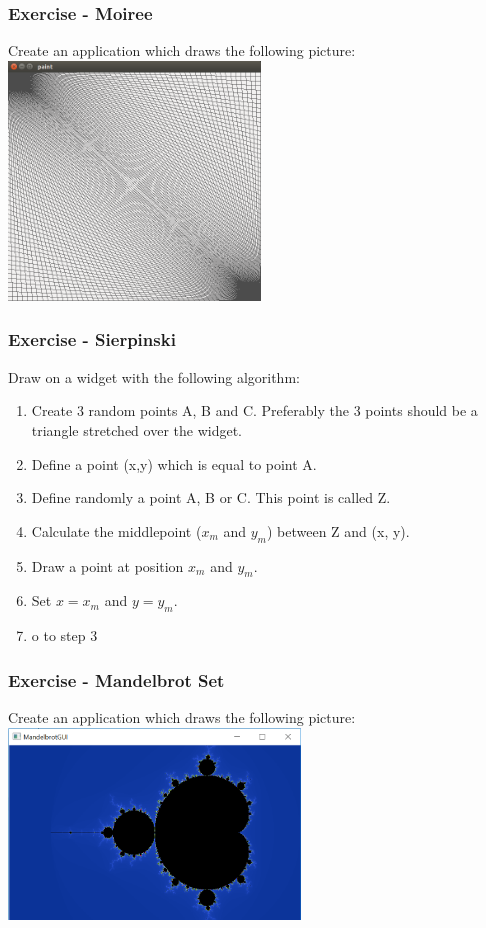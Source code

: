 \begin{frame}[fragile]
\frametitle{Exercise - Moiree}
Create an application which draws the following picture:\\
\vspace{3mm}
\includegraphics[width=190pt]{img/moiree.png}
\end{frame}

\begin{frame}[fragile]
\frametitle{Exercise - Sierpinski}
Draw on a widget with the following algorithm:
{\small
\begin{enumerate}
\item Create 3 random points A, B and C. Preferably the 3 points should
be a triangle stretched over the widget.
\item Define a point (x,y) which is equal to point A.
\item Define randomly a point A, B or C. This point is called Z.
\item Calculate the middlepoint ($x_m$ and $y_m$) between Z and (x, y).
\item Draw a point at position $x_m$ and $y_m$.
\item Set $x=x_m$ and $y=y_m$.
\item o to step 3
\end{enumerate}
}
\end{frame}

\begin{frame}[fragile]
\frametitle{Exercise - Mandelbrot Set}
Create an application which draws the following picture:\\
\vspace{3mm}
\includegraphics[width=220pt]{img/Mandelbrot.png}
\end{frame}

